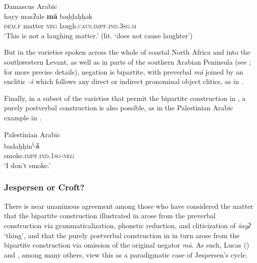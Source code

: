 \documentclass[output=paper]{langsci/langscibook}
\begin{document}
\ea\label{dam}
{       Damascus Arabic \citep[328]{Cowell1964}}\\
\gll hayy masʔale \textbf{mā} bəḍḍaḥḥək\\
     \textsc{dem.f} matter \textsc{neg} laugh.\textsc{caus.impf.ind.3sg.m}\\
\glt ‘This is not a laughing matter.’ (lit. ‘does not cause laughter’)
\z

But in the varieties spoken across the whole of coastal North Africa and into the southwestern Levant, as well as in parts of the southern Arabian Peninsula (see \citealt{Diem2014}; \citealt{Lucas2018} for more precise details), negation is bipartite, with preverbal \textit{mā} joined by an enclitic \textit{-š} which follows any direct or indirect pronominal object clitics, as in .

Finally, in a subset of the varieties that permit the bipartite construction in , a purely postverbal construction is also possible, as in the Palestinian Arabic example in .

\ea\label{pal}

{       Palestinian Arabic \citep[147]{Seeger2013grammar}}\\
\gll badaḫḫin\textsuperscript{i}-\textbf{š}\\
     smoke.\textsc{impf.ind.1sg-neg}\\
\glt ‘I don’t smoke.’
\z




\subsubsection{Jespersen or Croft?}\label{sec:jesp}



There is near unanimous agreement among those who have considered the matter that the bipartite construction illustrated in  arose from the preverbal construction via grammaticalization, phonetic reduction, and cliticization of \textit{šayʔ} ‘thing’, and that the purely postverbal construction in  in turn arose from the bipartite construction via omission of the original negator \textit{mā}. As such, Lucas (\citeyear{Lucas2007,Lucas2009,Lucas2018}) and \citet{Diem2014}, among many others, view this as a paradigmatic case of Jespersen’s cycle. 
\end{document}
